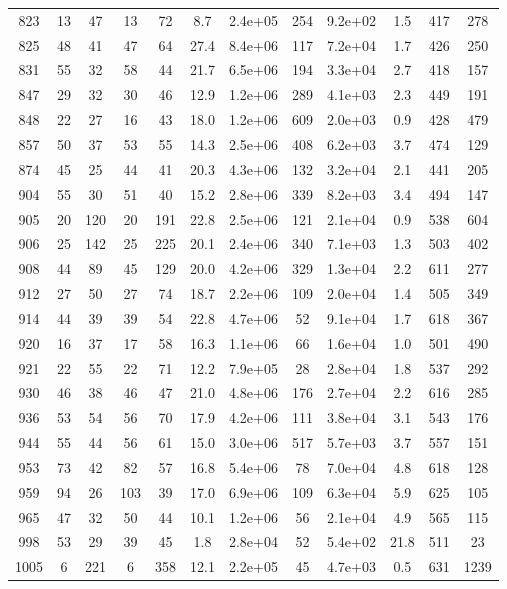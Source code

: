 \begin{table}
\begin{tabular}{cccccccccccc}
823 & 13 & 47 & 13 & 72 & 8.7 & 2.4e+05 & 254 & 9.2e+02 & 1.5 & 417 & 278 \\
825 & 48 & 41 & 47 & 64 & 27.4 & 8.4e+06 & 117 & 7.2e+04 & 1.7 & 426 & 250 \\
831 & 55 & 32 & 58 & 44 & 21.7 & 6.5e+06 & 194 & 3.3e+04 & 2.7 & 418 & 157 \\
847 & 29 & 32 & 30 & 46 & 12.9 & 1.2e+06 & 289 & 4.1e+03 & 2.3 & 449 & 191 \\
848 & 22 & 27 & 16 & 43 & 18.0 & 1.2e+06 & 609 & 2.0e+03 & 0.9 & 428 & 479 \\
857 & 50 & 37 & 53 & 55 & 14.3 & 2.5e+06 & 408 & 6.2e+03 & 3.7 & 474 & 129 \\
874 & 45 & 25 & 44 & 41 & 20.3 & 4.3e+06 & 132 & 3.2e+04 & 2.1 & 441 & 205 \\
904 & 55 & 30 & 51 & 40 & 15.2 & 2.8e+06 & 339 & 8.2e+03 & 3.4 & 494 & 147 \\
905 & 20 & 120 & 20 & 191 & 22.8 & 2.5e+06 & 121 & 2.1e+04 & 0.9 & 538 & 604 \\
906 & 25 & 142 & 25 & 225 & 20.1 & 2.4e+06 & 340 & 7.1e+03 & 1.3 & 503 & 402 \\
908 & 44 & 89 & 45 & 129 & 20.0 & 4.2e+06 & 329 & 1.3e+04 & 2.2 & 611 & 277 \\
912 & 27 & 50 & 27 & 74 & 18.7 & 2.2e+06 & 109 & 2.0e+04 & 1.4 & 505 & 349 \\
914 & 44 & 39 & 39 & 54 & 22.8 & 4.7e+06 & 52 & 9.1e+04 & 1.7 & 618 & 367 \\
920 & 16 & 37 & 17 & 58 & 16.3 & 1.1e+06 & 66 & 1.6e+04 & 1.0 & 501 & 490 \\
921 & 22 & 55 & 22 & 71 & 12.2 & 7.9e+05 & 28 & 2.8e+04 & 1.8 & 537 & 292 \\
930 & 46 & 38 & 46 & 47 & 21.0 & 4.8e+06 & 176 & 2.7e+04 & 2.2 & 616 & 285 \\
936 & 53 & 54 & 56 & 70 & 17.9 & 4.2e+06 & 111 & 3.8e+04 & 3.1 & 543 & 176 \\
944 & 55 & 44 & 56 & 61 & 15.0 & 3.0e+06 & 517 & 5.7e+03 & 3.7 & 557 & 151 \\
953 & 73 & 42 & 82 & 57 & 16.8 & 5.4e+06 & 78 & 7.0e+04 & 4.8 & 618 & 128 \\
959 & 94 & 26 & 103 & 39 & 17.0 & 6.9e+06 & 109 & 6.3e+04 & 5.9 & 625 & 105 \\
965 & 47 & 32 & 50 & 44 & 10.1 & 1.2e+06 & 56 & 2.1e+04 & 4.9 & 565 & 115 \\
998 & 53 & 29 & 39 & 45 & 1.8 & 2.8e+04 & 52 & 5.4e+02 & 21.8 & 511 & 23 \\
1005 & 6 & 221 & 6 & 358 & 12.1 & 2.2e+05 & 45 & 4.7e+03 & 0.5 & 631 & 1239 \\

\end{tabular}
\end{table}
